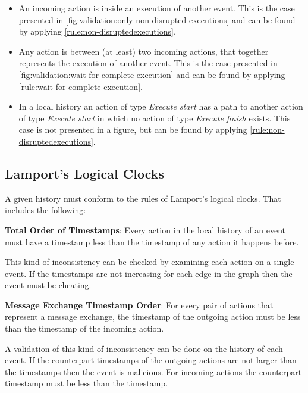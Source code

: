 	\begin{itemize}
		\item An incoming action is inside an execution of another event. This is the case presented in \ref{fig:validation:only-non-disrupted-executions} and can be found by applying \autoref{rule:non-disruptedexecutions}.
		\item Any action is between (at least) two incoming actions, that together represents the execution of another event. This is the case presented in \ref{fig:validation:wait-for-complete-execution} and can be found by applying \autoref{rule:wait-for-complete-execution}.
		\item In a local history an action of type \textit{Execute start} has a path to another action of type \textit{Execute start} in which no action of type \textit{Execute finish} exists. This case is not presented in a figure, but can be found by applying \autoref{rule:non-disruptedexecutions}.
	\end{itemize}
	
	\subsection{Lamport's Logical Clocks}
	A given history must conform to the rules of Lamport's logical clocks. That includes the following:
	
	\begin{ruledef}
		\textbf{Total Order of Timestamps}: Every action in the local history of an event must have a timestamp less than the timestamp of any action it happens before.
		\label{rule:total-order-timestamps}
	\end{ruledef}
	
	\noindent This kind of inconsistency can be checked by examining each action on a single event. If the timestamps are not increasing for each edge in the graph then the event must be cheating.
	
	\begin{ruledef}
		\textbf{Message Exchange Timestamp Order}: For every pair of actions that represent a message exchange, the timestamp of the outgoing action must be less than the timestamp of the incoming action.
		\label{rule:message-exchange-timestamp-order}
	\end{ruledef}
	
	\noindent A validation of this kind of inconsistency can be done on the history of each event. If the counterpart timestamps of the outgoing actions are not larger than the timestamps then the event is malicious. For incoming actions the counterpart timestamp must be less than the timestamp.
	

